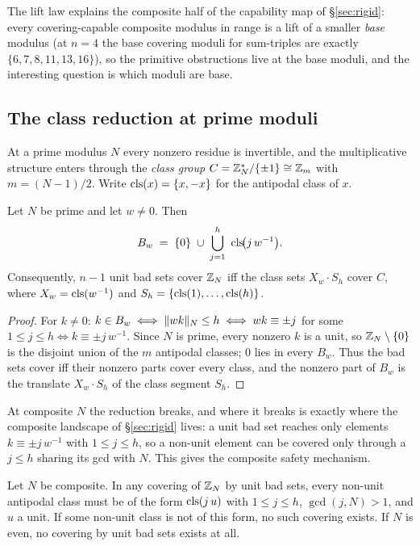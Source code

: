 The lift law explains the composite half of the capability map of
\S\ref{sec:rigid}: every covering-capable composite modulus in range is a
lift of a smaller \emph{base} modulus (at $n=4$ the base covering moduli
for sum-triples are exactly $\{6,7,8,11,13,16\}$), so the primitive
obstructions live at the base moduli, and the interesting question is which
moduli are base.

\subsection{The class reduction at prime moduli}

At a prime modulus $N$ every nonzero residue is invertible, and the
multiplicative structure enters through the \emph{class group}
$C=\mathbb{Z}_N^\ast/\{\pm1\}\cong\mathbb{Z}_m$ with $m=(N-1)/2$. Write
$\operatorname{cls}(x)=\{x,-x\}$ for the antipodal class of $x$.

\begin{lemma}\label{lem:class}
Let $N$ be prime and let $w\ne 0$. Then
\[
B_w\;=\;\{0\}\;\cup\;\bigcup_{j=1}^{h}\ \cls\!\bigl(j\,w^{-1}\bigr).
\]
Consequently, $n-1$ unit bad sets cover $\mathbb{Z}_N$ iff the class sets
$X_w\cdot S_h$ cover $C$, where $X_w=\operatorname{cls}(w^{-1})$ and
$S_h=\{\operatorname{cls}(1),\dots,\operatorname{cls}(h)\}$.
\end{lemma}

\begin{proof}
For $k\ne 0$: $k\in B_w\iff \lVert wk \rVert_{N}\le h\iff wk\equiv \pm j$ for some
$1\le j\le h\iff k\equiv \pm j\,w^{-1}$. Since $N$ is prime, every nonzero
$k$ is a unit, so $\mathbb{Z}_N\setminus\{0\}$ is the disjoint union of the $m$
antipodal classes; $0$ lies in every $B_w$. Thus the bad sets cover iff
their nonzero parts cover every class, and the nonzero part of $B_w$ is
the translate $X_w\cdot S_h$ of the class segment $S_h$.
\end{proof}

At composite $N$ the reduction breaks, and where it breaks is exactly
where the composite landscape of \S\ref{sec:rigid} lives: a unit bad set
reaches only elements $k\equiv\pm j\,w^{-1}$ with $1\le j\le h$, so a
non-unit element can be covered only through a $j\le h$ sharing its gcd
with $N$. This gives the composite safety mechanism.

\begin{proposition}\label{prop:reach}
Let $N$ be composite. In any covering of $\mathbb{Z}_N$ by unit bad sets, every
non-unit antipodal class must be of the form $\operatorname{cls}(j\,u)$ with
$1\le j\le h$, $\gcd(j,N)>1$, and $u$ a unit. If some non-unit class is
not of this form, no such covering exists. If $N$ is even, no covering by
unit bad sets exists at all.
\end{proposition}

